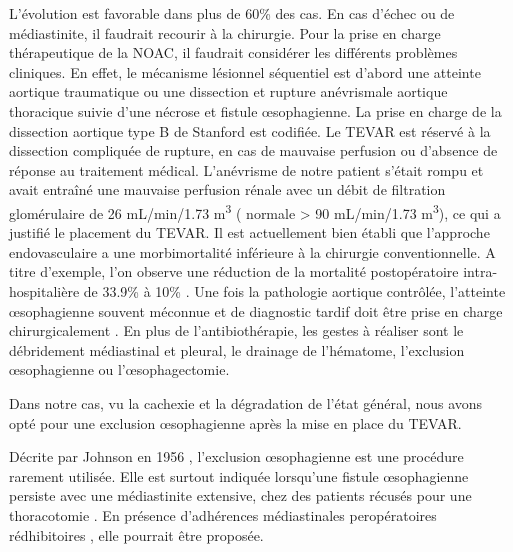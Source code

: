 \documentclass[./tfe.tex]{subfiles}
\begin{document}
L’évolution est favorable dans plus de 60\% des cas. En cas d’échec ou de médiastinite, il faudrait recourir à la chirurgie.
Pour la prise en charge thérapeutique de la NOAC, il faudrait considérer les différents problèmes cliniques. En effet, le mécanisme lésionnel séquentiel est d’abord une atteinte aortique traumatique ou une dissection et rupture anévrismale aortique thoracique suivie d’une nécrose et fistule œsophagienne.
La prise en charge de la dissection aortique type B de Stanford est codifiée. Le TEVAR est réservé à la dissection compliquée de rupture, en cas de mauvaise perfusion ou d’absence de réponse au traitement médical\cite{evangelista_insights_2018}. L’anévrisme de notre patient s’était rompu et avait entraîné une mauvaise perfusion rénale avec un débit de filtration glomérulaire de 26 mL/min/1.73 \si{\cubic\meter} ( normale > 90 mL/min/1.73 \si{\cubic\meter}), ce qui a justifié le placement du TEVAR. Il est actuellement bien établi que l’approche endovasculaire a une morbimortalité inférieure à la chirurgie conventionnelle. A titre d’exemple, l’on observe une réduction de la mortalité postopératoire intra-hospitalière de 33.9\% à 10\% \cite{evangelista_insights_2018}. 
Une fois la pathologie aortique contrôlée, l’atteinte œsophagienne souvent méconnue et de diagnostic tardif doit être prise en charge chirurgicalement \cite{iuamoto_necrose_2015, porcu_esophageal_2005, rascanu_osophagusnekrose_2009, abou-al-shaar_free_2016}. En plus de l’antibiothérapie, les gestes à réaliser sont le débridement médiastinal et pleural, le drainage de l’hématome, l’exclusion œsophagienne ou l’œsophagectomie.

Dans notre cas, vu la cachexie et la dégradation de l’état général, nous avons opté pour une exclusion œsophagienne après la mise en place du TEVAR.

Décrite par Johnson en 1956 \cite{rohatgi_role_2009}, l’exclusion œsophagienne est une procédure rarement utilisée. Elle est surtout indiquée lorsqu’une fistule œsophagienne persiste avec une médiastinite extensive, chez des patients récusés pour une thoracotomie \cite{rohatgi_role_2009}. En présence d’adhérences médiastinales peropératoires rédhibitoires \cite{seto_tracheo-bronchial_2014, czerny_new_2014}, elle pourrait être proposée.
\end{document}
